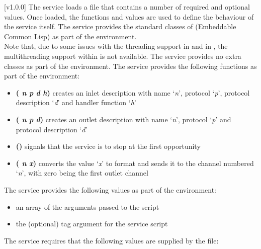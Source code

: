 [v1.0.0]
The \CLF{} service loads a \CL{} file that contains a number of required and optional
values.
Once loaded, the \CL{} functions and values are used to define the behaviour of the
service itself.
The \CLF{} service provides the standard classes of \ECL{} (Embeddable Common Lisp) as part
of the \CL{} environment.\\

Note that, due to some issues with the threading support in \ECL{} and in \yarp{}, the
multithreading support within \ECL{} is not available.
\secondaryEnd
{}
The \CLF{} service provides no extra classes as part of the \CL{} environment.
\secondaryEnd
{}
The \CLF{} service provides the following functions as part of the \CL{} environment:
\begin{itemize}
\item\textbf{( \textit{n} \textit{p} \textit{d} \textit{h})}
\longDash{} creates an inlet description with name `\textit{n}', protocol `\textit{p}',
protocol description `\textit{d}' and handler function `\textit{h}'
\item\exSp\textbf{( \textit{n} \textit{p} \textit{d})}
\longDash{} creates an outlet description with name `\textit{n}', protocol `\textit{p}'
and protocol description `\textit{d}' 
\item\exSp\textbf{()} \longDash{} signals that the service is to stop
at the first opportunity
\item\exSp\textbf{( \textit{n} \textit{x})} \longDash{} converts the
value `\textit{x}' to \yarp{} format and sends it to the channel numbered `\textit{n}',
with zero being the first outlet channel
\end{itemize}
\secondaryEnd
{}
The \CLF{} service provides the following values as part of the \CL{} environment:
\begin{itemize}
\item\exSp\textbf{} \longDash{} an array of the arguments passed to the
script
\item\exSp\textbf{} \longDash{} the (optional) tag argument for the service
script
\end{itemize}
\secondaryEnd
\condPage
{}
The \CLF{} service requires that the following values are supplied by the \CL{} file:
